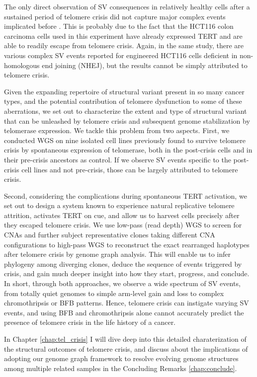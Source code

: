 \documentclass[phd,tocprelim]{cornell}
\begin{document}
The only direct observation of SV consequences in relatively healthy cells after a sustained period of telomere crisis did not capture major complex events implicated before \cite{Cleal2019-dk}. This is probably due to the fact that the HCT116 colon carcinoma cells used in this experiment have already expressed TERT and are able to readily escape from telomere crisis. Again, in the same study, there are various complex SV events reported for engineered HCT116 cells deficient in non-homologous end joining (NHEJ), but the results cannot be simply attributed to telomere crisis.

Given the expanding repertoire of structural variant present in so many cancer types, and the potential contribution of telomere dysfunction to some of these aberrations, we set out to characterize the extent and type of structural variant that can be unleashed by telomere crisis and subsequent genome stabilization by telomerase expression. We tackle this problem from two aspects. First, we conducted WGS on nine isolated cell lines previously found to survive telomere crisis by spontaneous expression of telomerase, both in the post-crisis cells and in their pre-crisis ancestors as control. If we observe SV events specific to the post-crisis cell lines and not pre-crisis, those can be largely attributed to telomere crisis.

Second, considering the complications during spontaneous TERT activation, we set out to design a system known to experience natural replicative telomere attrition, activates TERT on cue, and allow us to harvest cells precisely after they escaped telomere crisis. We use low-pass (read depth) WGS to screen for CNAs and further subject representative clones taking different CNA configurations to high-pass WGS to reconstruct the exact rearranged haplotypes after telomere crisis by genome graph analysis. This will enable us to infer phylogeny among diverging clones, deduce the sequence of events triggered by crisis, and gain much deeper insight into how they start, progress, and conclude. In short, through both approaches, we observe a wide spectrum of SV events, from totally quiet genomes to simple arm-level gain and loss to complex chromothripsis or BFB patterns. Hence, telomere crisis can instigate varying SV events, and using BFB and chromothripsis alone cannot accurately predict the presence of telomere crisis in the life history of a cancer.

In Chapter \ref{chap:tel_crisis} I will dive deep into this detailed charaterization of the structural outcomes of telomere crisis, and discuss about the implications of adopting our genome graph framework to resolve evolving genome structures among multiple related samples in the Concluding Remarks \ref{chap:conclude}.
\end{document}
